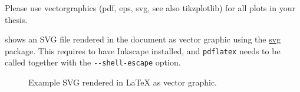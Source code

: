 Please use vectorgraphics (pdf, eps, svg, see also tikzplotlib) for all plots in your thesis.  


 shows an SVG file rendered in the document as vector graphic using the \href{https://ctan.org/pkg/svg?lang=en}{svg} package.
This requires to have Inkscape installed, and \texttt{pdflatex} needs to be called together with the \texttt{-{}-shell-escape} option.

\begin{figure}[ht!]
    \centering
    
    \caption{Example SVG rendered in \LaTeX{} as vector graphic.}
    \label{fig:svgexample}
\end{figure}

